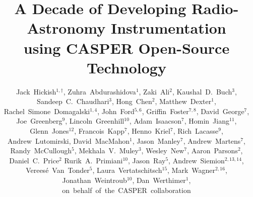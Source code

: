 \documentclass{ws-jai}
\begin{document}
\catchline{}{}{}{}{} %


\title{A Decade of Developing Radio-Astronomy Instrumentation\\using CASPER Open-Source Technology}

\author{Jack~Hickish$^{1,\dagger}$,
Zuhra~Abdurashidova$^1$,
Zaki~Ali$^2$,
Kaushal~D.~Buch$^3$,
Sandeep~C.~Chaudhari$^3$,
Hong~Chen$^2$,
Matthew~Dexter$^1$,
Rachel~Simone~Domagalski$^{1,4}$,
John~Ford$^{5,6}$,
Griffin~Foster$^{7,8}$,
David~George$^7$,
Joe~Greenberg$^9$,
Lincoln~Greenhill$^{10}$,
Adam~Isaacson$^7$,
Homin~Jiang$^{11}$,
Glenn~Jones$^{12}$,
Francois~Kapp$^7$,
Henno~Kriel$^7$,
Rich~Lacasse$^9$,
Andrew~Lutomirski,
David~MacMahon$^1$,
Jason~Manley$^7$,
Andrew~Martens$^7$,
Randy~McCullough$^5$,
Mekhala~V.~Muley$^3$,
Wesley~New$^7$,
Aaron~Parsons$^2$,
Daniel~C.~Price$^2$
Rurik~A.~Primiani$^{10}$,
Jason~Ray$^5$,
Andrew~Siemion$^{2,13,14}$,
Verees\'e~Van~Tonder$^5$,
Laura~Vertatschitsch$^{15}$,
Mark~Wagner$^{2,16}$,
Jonathan~Weintroub$^{10}$,
Dan~Werthimer$^1$,
on~behalf~of~the~CASPER~collaboration
}
\end{document}
